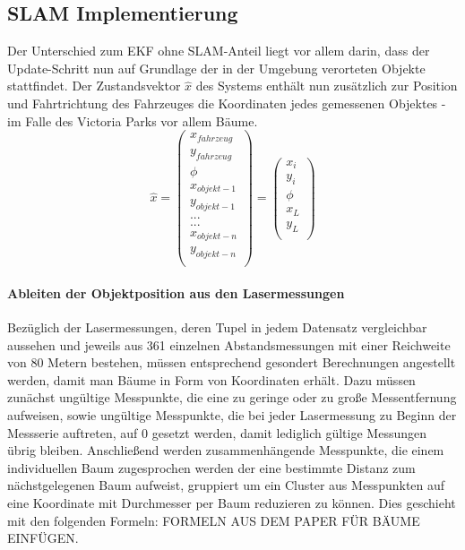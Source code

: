 \documentclass[11pt]{article}
\begin{document}
\subsection{SLAM Implementierung}\label{SLAM Implementierung}
Der Unterschied zum EKF ohne SLAM-Anteil liegt vor allem darin, dass der Update-Schritt nun auf Grundlage der in der Umgebung verorteten Objekte stattfindet. Der Zustandsvektor $\hat{x}$ des Systems enthält nun zusätzlich zur Position und Fahrtrichtung des Fahrzeuges die Koordinaten jedes gemessenen Objektes - im Falle des Victoria Parks vor allem Bäume. 
\begin{equation}\label{SLAM-State-Vector}
	\hat{x} = \begin{pmatrix}
		x_{fahrzeug} \\
		y_{fahrzeug} \\
		\phi \\
		x_{objekt-1} \\
		y_{objekt-1} \\
		... \\
		... \\
		x_{objekt-n} \\
		y_{objekt-n} \\
	  \end{pmatrix} = \begin{pmatrix}
		  x_i \\
		  y_i \\
		  \phi \\
		  x_L \\
		  y_L \\
	  \end{pmatrix}
\end{equation}

\paragraph{Ableiten der Objektposition aus den Lasermessungen}
Bezüglich der Lasermessungen, deren Tupel in jedem Datensatz vergleichbar aussehen und jeweils aus 361 einzelnen Abstandsmessungen mit einer Reichweite von 80 Metern bestehen, müssen entsprechend gesondert Berechnungen angestellt werden, damit man Bäume in Form von Koordinaten erhält. Dazu müssen zunächst ungültige Messpunkte, die eine zu geringe oder zu große Messentfernung aufweisen, sowie ungültige Messpunkte, die bei jeder Lasermessung zu Beginn der Messserie auftreten, auf 0 gesetzt werden, damit lediglich gültige Messungen übrig bleiben. Anschließend werden zusammenhängende Messpunkte, die einem individuellen Baum zugesprochen werden der eine bestimmte Distanz zum nächstgelegenen Baum aufweist, gruppiert um ein Cluster aus Messpunkten auf eine Koordinate mit Durchmesser per Baum reduzieren zu können. Dies geschieht mit den folgenden Formeln: FORMELN AUS DEM PAPER FÜR BÄUME EINFÜGEN.
\end{document}
